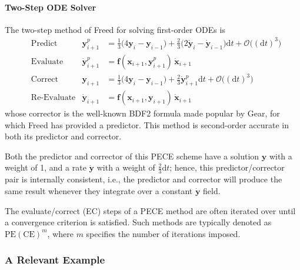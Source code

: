 \paragraph{Two-Step ODE Solver}

The two-step method of Freed \cite{Freed17a} for solving first-order ODEs is
\begin{subequations}
    \label{1stOrderODEs}
    \begin{align}
    \mbox{} & \text{Predict} & 
    \mathbf{y}_{i+1}^p & = \tfrac{1}{3} 
    \bigl( 4 \mathbf{y}_i - \mathbf{y}_{i-1} \bigr) + 
    \tfrac{2}{3} \bigl( 2 \dot{\mathbf{y}}_i - \dot{\mathbf{y}}_{i-1} 
    \bigr) \mathrm{d}t + \mathcal{O} \bigl( (\mathrm{d}t)^3 \bigr)
    \label{1stOrderPredictor} \\
    \mbox{} & \text{Evaluate} & 
    \dot{\mathbf{y}}^p_{i+1} & = \mathbf{f} (\mathbf{x}_{i+1} , \mathbf{y}_{i+1}^p) \, \dot{\mathbf{x}}_{i+1}
    \label{1stOrderEvaluate} \\
    \mbox{} & \text{Correct} &
    \mathbf{y}_{i+1} & = \tfrac{1}{3} 
    \bigl( 4 \mathbf{y}_i - \mathbf{y}_{i-1} \bigr) + 
    \tfrac{2}{3} \dot{\mathbf{y}}^{p}_{i+1} \mathrm{d}t + 
    \mathcal{O} \bigl( (\mathrm{d}t)^3 \bigr)
    \label{1stOrderCorrector} \\
    \mbox{} & \text{Re-Evaluate} & 
    \dot{\mathbf{y}}_{i+1} & = \mathbf{f} (\mathbf{x}_{i+1} , \mathbf{y}_{i+1}) \, 
    \dot{\mathbf{x}}_{i+1}
    \label{1stOrderReEvaluate}
    \end{align}
\end{subequations} 
whose corrector is the well-known BDF2 formula made popular by Gear, for which Freed has provided a predictor.  This method is second-order accurate in both its predictor and corrector.

Both the predictor and corrector of this PECE scheme have a solution $\mathbf{y}$ with a weight of 1, and a rate $\dot{\mathbf{y}}$ with a weight of $\tfrac{2}{3} \mathrm{d}t$; hence, this predictor\slash corrector pair is internally consistent, i.e., the predictor and corrector will produce the same result whenever they integrate over a constant $\dot{\mathbf{y}}$ field. 

The evaluate\slash correct (EC) steps of a PECE method are often iterated over until a convergence criterion is satisfied.  Such methods are typically denoted as $\text{PE}(\text{CE})^m$, where $m$ specifies the number of iterations imposed.


\subsubsection{A Relevant Example}

